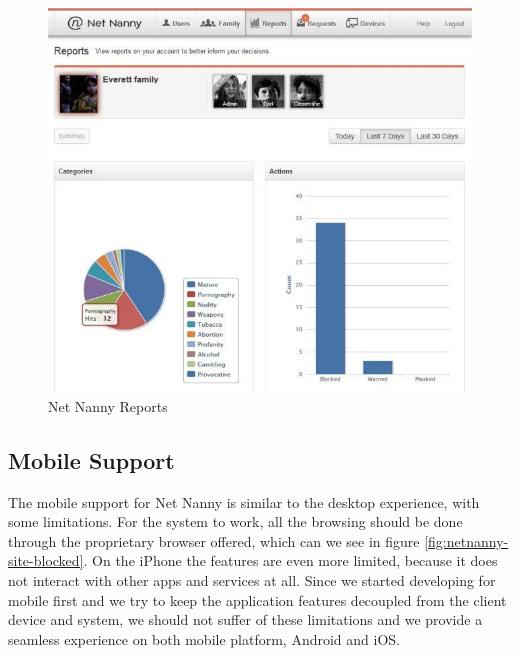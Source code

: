 \begin{figure}[th]
\centering
\includegraphics[width=1\textwidth]{Figures/netnanny-summary-report}
\decoRule
\caption{Net Nanny Reports}
\label{fig:netnanny-summary-report}
\end{figure}

\subsection{Mobile Support}

The mobile support for Net Nanny is similar to the desktop experience, with some limitations. For the system to work, all the browsing should be done through the proprietary browser offered, which can we see in figure \ref{fig:netnanny-site-blocked}. On the iPhone the features are even more limited, because it does not interact with other apps and services at all. Since we started developing for mobile first and we try to keep the application features decoupled from the client device and system, we should not suffer of these limitations and we provide a seamless experience on both mobile platform, Android and iOS. \parencite{netNannyPCMag}


